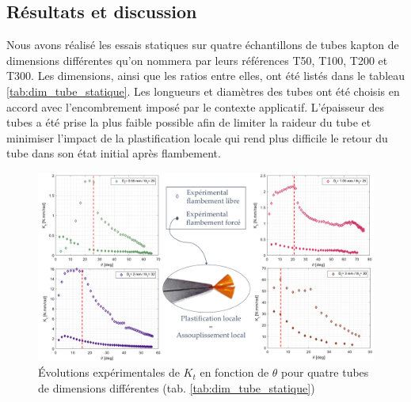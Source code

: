 	\subsection{Résultats et discussion}
	\label{subsec:4.2.4_Résultats et discussion}
Nous avons réalisé les essais statiques sur quatre échantillons de tubes kapton de dimensions différentes qu'on nommera par leurs références T50, T100, T200 et T300. Les dimensions, ainsi que les ratios entre elles, ont été listés dans le tableau \ref{tab:dim_tube_statique}. Les longueurs et diamètres des tubes ont été choisis en accord avec l'encombrement imposé par le contexte applicatif. L'épaisseur des tubes a été prise la plus faible possible afin de limiter la raideur du tube et minimiser l'impact de la plastification locale qui rend plus difficile le retour du tube dans son état initial après flambement.
\begin{figure}[!htb]
	\begin{center}
		\captionsetup{justification=centering}
		\includegraphics[trim={0cm 0cm 0cm 0cm},clip,width=\textwidth]{../Chap4/Figure/resultats_essais_statique_VH_tous_sans_simu.pdf}
		\caption{Évolutions expérimentales de $K_t$ en fonction de $\theta$ pour quatre tubes de dimensions différentes (tab. \ref{tab:dim_tube_statique})}
		\label{fig:resultats_essais_statique_VH_tous}
	\end{center}
\end{figure} 

